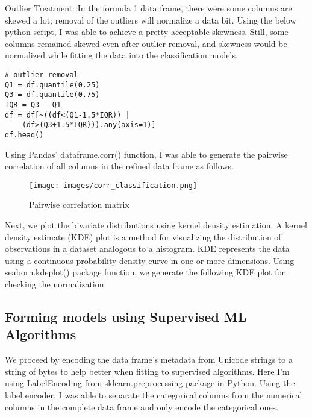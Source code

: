 \documentclass[10pt,twocolumn,letterpaper]{article}
\begin{document}
Outlier Treatment: In the formula 1 data frame, there were some columns are skewed a lot; removal of the outliers will normalize a data bit. Using the below python script, I was able to achieve a pretty acceptable skewness. Still, some columns remained skewed even after outlier removal, and skewness would be normalized while fitting the data into the classification models.

\begin{verbatim}
# outlier removal 
Q1 = df.quantile(0.25)
Q3 = df.quantile(0.75)
IQR = Q3 - Q1
df = df[~((df<(Q1-1.5*IQR)) | 
    (df>(Q3+1.5*IQR))).any(axis=1)]
df.head()
\end{verbatim}

Using Pandas' dataframe.corr() function, I was able to generate the pairwise correlation of all columns in the refined data frame as follows.

\begin{figure}[h]
\centering
\texttt{[image: images/corr\_classification.png]} 
\caption{Pairwise correlation matrix }
\end{figure}

Next, we plot the bivariate distributions using kernel density estimation.
A kernel density estimate (KDE) plot is a method for visualizing the distribution of observations in a dataset analogous to a histogram. KDE represents the data using a continuous probability density curve in one or more dimensions. Using seaborn.kdeplot() package function, we generate the following KDE plot for checking the normalization


\subsection{Forming models using Supervised ML Algorithms}

We proceed by encoding the data frame's metadata from Unicode strings to a string of bytes to help better when fitting to supervised algorithms. Here I'm using LabelEncoding from sklearn.preprocessing package in Python. Using the label encoder, I was able to separate the categorical columns from the numerical columns in the complete data frame and only encode the categorical ones. \\
\end{document}
